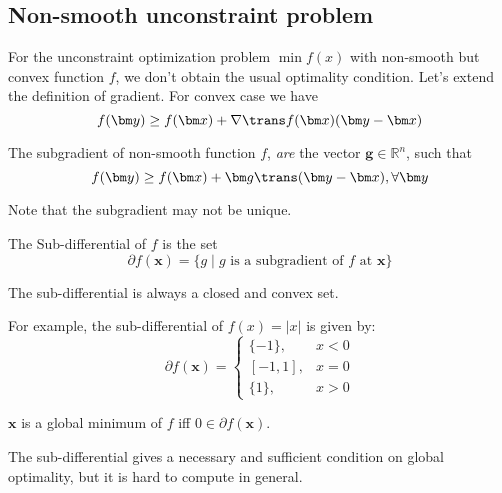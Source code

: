 \subsection{Non-smooth unconstraint problem}
For the unconstraint optimization problem $\min f(x)$ with non-smooth but convex function $f$, we don't obtain the usual optimality condition. Let's extend the definition of gradient. For convex case we have
\[
f(\bm y)\ge f(\bm x)+\nabla\trans f(\bm x)(\bm y-\bm x)
\]
\begin{definition}[Subgradient]
The subgradient of non-smooth function $f$, \emph{are} the vector $\bm g\in\mathbb{R}^n$, such that
\begin{equation}
f(\bm y)\ge f(\bm x)+\bm g\trans(\bm y-\bm x),\forall\bm y
\end{equation}
\end{definition}
Note that the subgradient may not be unique.
\begin{definition}
The Sub-differential of $f$ is the set
\begin{equation}
\partial f(\bm x)=\{g\mid \mbox{$g$ is a subgradient of $f$ at $\bm x$}\}
\end{equation}
\end{definition}
The sub-differential is always a closed and convex set.

For example, the sub-differential of $f(x)=|x|$ is given by:
\[
\partial f(\bm x)=\left\{
\begin{aligned}
\{-1\},&x<0\\
[-1,1],&x=0\\
\{1\},&x>0
\end{aligned}
\right.\]
\begin{proposition}
$\bm x$ is a global minimum of $f$ iff $0\in\partial f(\bm x)$.
\end{proposition}
\begin{remark}
The sub-differential gives a necessary and sufficient condition on global optimality, but it is hard to compute in general.
\end{remark}















